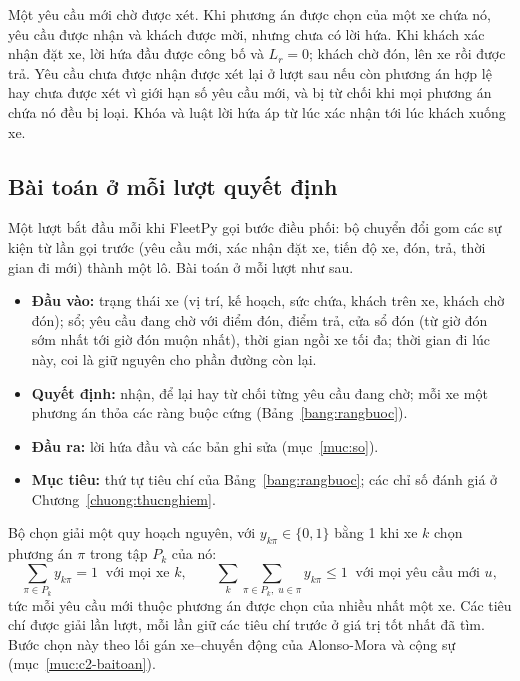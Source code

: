 Một yêu cầu mới chờ được xét. Khi phương án được chọn của một xe chứa nó, yêu cầu được nhận và khách được mời,
nhưng chưa có lời hứa. Khi khách xác nhận đặt xe, lời hứa đầu được công bố và $L_r = 0$; khách chờ đón, lên xe
rồi được trả. Yêu cầu chưa được nhận được xét lại ở lượt sau nếu còn phương án hợp lệ hay chưa được xét vì giới
hạn số yêu cầu mới, và bị từ chối khi mọi phương án chứa nó đều bị loại. Khóa và luật lời hứa áp từ lúc xác nhận
tới lúc khách xuống xe.

\subsection{Bài toán ở mỗi lượt quyết định}
\label{muc:baitoan-phatbieu}

Một lượt bắt đầu mỗi khi FleetPy gọi bước điều phối: bộ chuyển đổi gom các sự kiện từ lần gọi trước (yêu cầu
mới, xác nhận đặt xe, tiến độ xe, đón, trả, thời gian đi mới) thành một lô. Bài toán ở mỗi lượt như sau.
\begin{itemize}[leftmargin=1.2cm,itemsep=2pt,topsep=3pt]
\item \textbf{Đầu vào:} trạng thái xe (vị trí, kế hoạch, sức chứa, khách trên xe, khách chờ đón); sổ; yêu cầu
đang chờ với điểm đón, điểm trả, cửa sổ đón (từ giờ đón sớm nhất tới giờ đón muộn nhất), thời gian ngồi xe tối
đa; thời gian đi lúc này, coi là giữ nguyên cho phần đường còn lại.
\item \textbf{Quyết định:} nhận, để lại hay từ chối từng yêu cầu đang chờ; mỗi xe một phương án thỏa các ràng
buộc cứng (Bảng~\ref{bang:rangbuoc}).
\item \textbf{Đầu ra:} lời hứa đầu và các bản ghi sửa (mục~\ref{muc:so}).
\item \textbf{Mục tiêu:} thứ tự tiêu chí của Bảng~\ref{bang:rangbuoc}; các chỉ số đánh giá ở
Chương~\ref{chuong:thucnghiem}.
\end{itemize}

Bộ chọn giải một quy hoạch nguyên, với $y_{k\pi} \in \{0, 1\}$ bằng 1 khi xe $k$ chọn phương án $\pi$ trong
tập $P_k$ của nó:
\begin{equation}
\sum_{\pi \in P_k} y_{k\pi} = 1 \;\;\text{với mọi xe } k, \qquad
\sum_{k} \sum_{\pi \in P_k,\; u \in \pi} y_{k\pi} \le 1 \;\;\text{với mọi yêu cầu mới } u ,
\label{eq:chon}
\end{equation}
tức mỗi yêu cầu mới thuộc phương án được chọn của nhiều nhất một xe. Các tiêu chí được giải lần lượt, mỗi lần giữ
các tiêu chí trước ở giá trị tốt nhất đã tìm. Bước chọn này theo lối gán xe--chuyến động của Alonso-Mora và cộng
sự~\cite{alonsomora2017} (mục~\ref{muc:c2-baitoan}).

